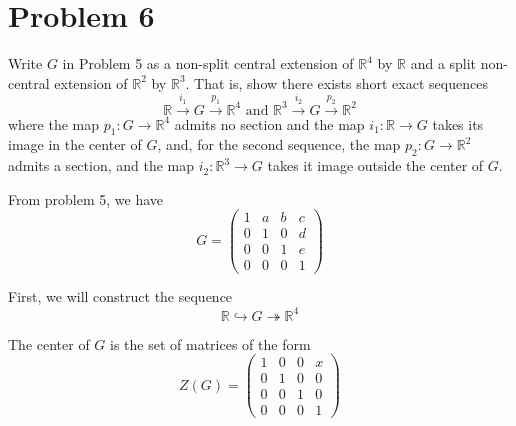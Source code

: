 \documentclass[12pt]{article}
\newcommand{\R}{\mathbb{R}}
\begin{document}
    \color{black}

\pagebreak
\section*{Problem 6}
Write $G$ in Problem 5 as a non-split central extension of $\R^{4}$ by $\R$ and a split non-central extension of $\R^{2}$ by $\R^{3}$.  That is, show there exists short exact sequences
\[
\R \xrightarrow{i_{1}} G \xrightarrow{p_{1}} \R^{4} \text{ and }\R^{3} \xrightarrow{i_{2}}  G  \xrightarrow{p_{2}}  \R^{2}
\]
where the map $p_{1} : G \longrightarrow \R^{4}$ admits no section and the map $i_{1}: \R \longrightarrow G$ takes its image in the center of $G$, and, for the second sequence, the map $p_{2}: G \longrightarrow \R^{2}$ admits a section, and the map $i_{2}: \R^{3} \longrightarrow G$ takes it image outside the center of $G$.  

    \color{blue}    
        From problem 5, we have 
        \[G = \begin{pmatrix}
            1 & a & b & c \\
            0 & 1 & 0 & d \\
            0 & 0 & 1 & e \\
            0 & 0 & 0 & 1 
        \end{pmatrix}\]

        First, we will construct the sequence 
        \[\R \hookrightarrow G \twoheadrightarrow \R^4\]

        The center of $G$ is the set of matrices of the form
        \[Z(G) = \begin{pmatrix}
            1 & 0 & 0 & x\\
            0 & 1 & 0 & 0\\
            0 & 0 & 1 & 0\\
            0 & 0 & 0 & 1
        \end{pmatrix}\]
\end{document}
